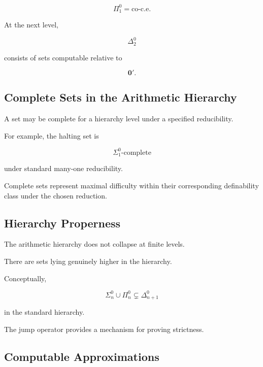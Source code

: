 \[
\boxed{
\Pi^0_1
=
\text{co-c.e.}
}
\]

At the next level,

\[
\Delta^0_2
\]

consists of sets computable relative to

\[
\boxed{
\mathbf{0}'.
}
\]

\subsection{Complete Sets in the Arithmetic Hierarchy}
\label{subsec:arithmetic-hierarchy-complete-sets}

A set may be complete for a hierarchy level under a specified reducibility.

For example, the halting set is

\[
\boxed{
\Sigma^0_1\text{-complete}
}
\]

under standard many-one reducibility.

Complete sets represent maximal difficulty within their corresponding
definability class under the chosen reduction.

\subsection{Hierarchy Properness}
\label{subsec:arithmetic-hierarchy-properness}

The arithmetic hierarchy does not collapse at finite levels.

There are sets lying genuinely higher in the hierarchy.

Conceptually,

\[
\boxed{
\Sigma^0_n
\cup
\Pi^0_n
\subsetneq
\Delta^0_{n+1}
}
\]

in the standard hierarchy.

The jump operator provides a mechanism for proving strictness.

\subsection{Computable Approximations}
\label{subsec:computable-approximations}

